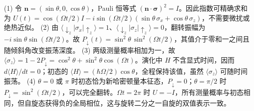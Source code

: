 (1) 令 \(\mathbf n=(\sin\theta,0,\cos\theta)\)，Pauli 恒等式 \((\mathbf n\cdot\boldsymbol\sigma)^2=I\)。因此指数可精确求和为 \(U(t)=\cos(\Omega t/2)I-i\sin(\Omega t/2)(\sin\theta\,\sigma_x+\cos\theta\,\sigma_z)\)，不需要微扰或绝热近似。
(2) 由 \(\langle\downarrow_z|\sigma_x|\uparrow_z\rangle=1\)、\(\langle\downarrow_z|\sigma_z|\uparrow_z\rangle=0\)，翻转振幅为 \(-i\sin\theta\sin(\Omega t/2)\)。故 \(P_\downarrow(t)=\sin^2\theta\,\sin^2(\Omega t/2)\)，其值介于零和一之间且随倾斜角改变振荡深度。
(3) 两级测量概率相加为一，故 \(\langle\sigma_z\rangle=1-2P_\downarrow=\cos^2\theta+\sin^2\theta\cos(\Omega t)\)。演化中 \(H\) 不含显式时间，因而 \(d\langle H\rangle/dt=0\)；初态的 \(\langle H\rangle=(\hbar\Omega/2)\cos\theta\)，全程保持该值，虽然 \(\langle\sigma_z\rangle\) 可随时间振荡。
(4) \(\theta=0\) 或 \(\pi\) 时初态恰为新哈密顿量本征态，\(P_\downarrow=0\)；\(\theta=\pi/2\) 时 \(P_\downarrow=\sin^2(\Omega t/2)\)，可以完全翻转。\(\Omega t=2\pi\) 时 \(U=-I\)，所有测量概率与初态相同，但自旋态获得负的全局相位，这与旋转二分之一自旋的双值表示一致。
